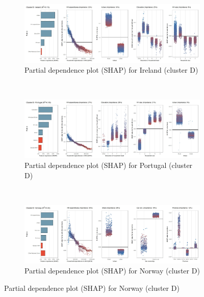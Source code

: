 \begin{figure}[ht!]\ContinuedFloat
    \centering
   \begin{subfigure}[b]{\textwidth}
         \centering
         \caption{Partial dependence plot (SHAP) for Ireland (cluster D)}
         \label{fig:5b_IRL}
         \includegraphics[width=\textwidth]{Figure 5b/Figure_5b_IRL}         
     \end{subfigure}
    \\
    \vspace{0.5cm}
   \begin{subfigure}[b]{\textwidth}
         \centering
         \caption{Partial dependence plot (SHAP) for Portugal (cluster D)}
         \label{fig:5b_PRT}
         \includegraphics[width=\textwidth]{Figure 5b/Figure_5b_PRT}         
     \end{subfigure}
    \\
    \vspace{0.5cm}
   \begin{subfigure}[b]{\textwidth}
         \centering
         \caption{Partial dependence plot (SHAP) for Norway (cluster D)}
         \label{fig:5b_NOR}
         \includegraphics[width=\textwidth]{Figure 5b/Figure_5b_NOR}

\end{subfigure}
\end{figure}
